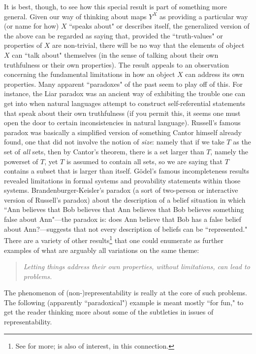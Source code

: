 \documentclass[a4paper]{book}
\theoremstyle{definition}
\theoremstyle{definition}
\theoremstyle{definition}
\theoremstyle{theorem}
\theoremstyle{definition}
\begin{document}
It is best, though, to see how this special result is part of something more general. Given our way of thinking about maps $Y^X$ as providing a particular way (or name for how) $X$ ``speaks about" or describes itself, the generalized version of the above can be regarded as saying that, provided the ``truth-values" or properties of $X$ are non-trivial, there will be no way that the elements of object $X$ can ``talk about" themselves (in the sense of talking about their own truthfulness or their own properties). The result appeals to an observation concerning the fundamental limitations in how an object $X$ can address its own properties. Many apparent ``paradoxes" of the past seem to play off of this. For instance, the Liar paradox was an ancient way of exhibiting the trouble one can get into when natural languages attempt to construct self-referential statements that speak about their own truthfulness (if you permit this, it seems one must open the door to certain inconsistencies in natural language). Russell's famous paradox was basically a simplified version of something Cantor himself already found, one that did not involve the notion of \textit{size}: namely that if we take $T$ as the set of \textit{all} sets, then by Cantor's theorem, there is a set larger than $T$, namely the powerset of $T$, yet $T$ is assumed to contain all sets, so we are saying that $T$ contains a subset that is larger than itself. G\"{o}del's famous incompleteness results revealed limitations in formal systems and provability statements within those systems. Brandenburger-Keisler's paradox (a sort of two-person or interactive version of Russell's paradox) about the description of a belief situation in which ``Ann believes that Bob believes that Ann believes that Bob believes something false about Ann"---the paradox is: does Ann believe that Bob has a false belief about Ann?---suggests that not every description of beliefs can be ``represented." There are a variety of other results\footnote{See \cite{yanofsky_universal_2003} for more; \cite{abramsky_contextual_2014} is also of interest, in this connection.} that one could enumerate as further examples of what are arguably all variations on the same theme: 
\begin{quote}
	\textit{Letting things address their own properties, without limitations, can lead to problems.} 
\end{quote}    
The phenomenon of (non-)representability is really at the core of such problems. The following (apparently ``paradoxical") example is meant mostly ``for fun," to get the reader thinking more about some of the subtleties in issues of representability.  
\end{document}

